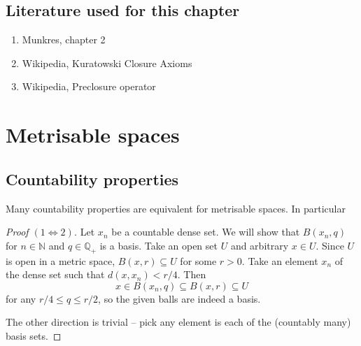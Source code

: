 \section{Literature used for this chapter}
\begin{enumerate}
    \item Munkres, chapter 2
    \item Wikipedia, Kuratowski Closure Axioms
    \item Wikipedia, Preclosure operator
\end{enumerate}

\chapter{Metrisable spaces}

\section{Countability properties}

Many countability properties are equivalent for metrisable spaces. In particular

\begin{proof}[Proof \( (1 \Leftrightarrow 2) \)]
    Let \( x_n \) be a countable dense set. We will show that \( B(x_n, q) \) for \( n \in \mathbb{N} \) and \( q \in \mathbb{Q}_{+} \) is a basis. Take an open set \( U  \) and arbitrary \( x \in U \). Since \( U \) is open in a metric space, \( B(x,r) \subseteq U \) for some \( r > 0 \). Take an element \( x_n \) of the dense set such that \( d(x, x_n) < r/4 \). Then
    \[ 
       x \in B(x_n, q) \subseteq B(x, r) \subseteq U
   \]
   for any \( r/4 \leqslant q \leqslant r/2 \), so the given balls are indeed a basis.
   
   The other direction is trivial -- pick any element is each of the (countably many) basis sets.
\end{proof}

